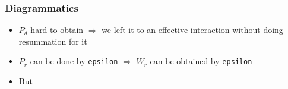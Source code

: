 \documentclass{beamer}
\newcommand{\shortcode}[1]{\texttt{#1}}
\begin{document}
\begin{frame}
\frametitle{Diagrammatics}

\begin{itemize}
    \item $P_d$ hard to obtain $\Rightarrow$ we left it to an effective interaction 
    without doing resummation for it
    \item $P_r$ can be done by \shortcode{epsilon} $\Rightarrow$
        $W_r$ can be obtained by \shortcode{epsilon}
    \item But 
    \begin{center}
        \begin{tikzpicture}[x=0.75pt,y=0.75pt,yscale=-0.6,xscale=0.6]
            

\end{tikzpicture}
\end{center}
\end{itemize}
\end{frame}
\end{document}
